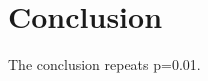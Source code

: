 \documentclass{article}
\begin{document}
\begin{abstract}
Candidate significantly improves exact match with p=0.01.
\end{abstract}
\section{Conclusion}
The conclusion repeats p=0.01.
\end{document}
